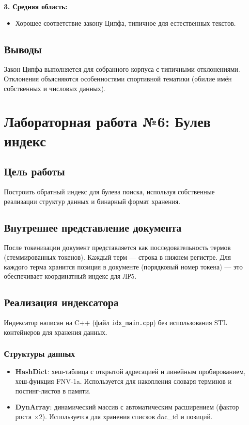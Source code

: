 \documentclass[a4paper,12pt]{article}
\begin{document}
\textbf{3. Средняя область:}
\begin{itemize}
    \item Хорошее соответствие закону Ципфа, типичное для естественных текстов.
\end{itemize}

\subsection{Выводы}
Закон Ципфа выполняется для собранного корпуса с типичными отклонениями. Отклонения объясняются особенностями спортивной тематики (обилие имён собственных и числовых данных).

\section{Лабораторная работа №6: Булев индекс}

\subsection{Цель работы}
Построить обратный индекс для булева поиска, используя собственные реализации структур данных и бинарный формат хранения.

\subsection{Внутреннее представление документа}
После токенизации документ представляется как последовательность термов (стеммированных токенов). Каждый терм — строка в нижнем регистре. Для каждого терма хранится позиция в документе (порядковый номер токена) — это обеспечивает координатный индекс для ЛР5.

\subsection{Реализация индексатора}
Индексатор написан на C++ (файл \texttt{idx\_main.cpp}) без использования STL контейнеров для хранения данных.

\subsubsection{Структуры данных}
\begin{itemize}
    \item \textbf{HashDict}: хеш-таблица с открытой адресацией и линейным пробированием, хеш-функция FNV-1a. Используется для накопления словаря терминов и постинг-листов в памяти.
    \item \textbf{DynArray}: динамический массив с автоматическим расширением (фактор роста $\times$2). Используется для хранения списков doc\_id и позиций.
\end{itemize}
\end{document}
